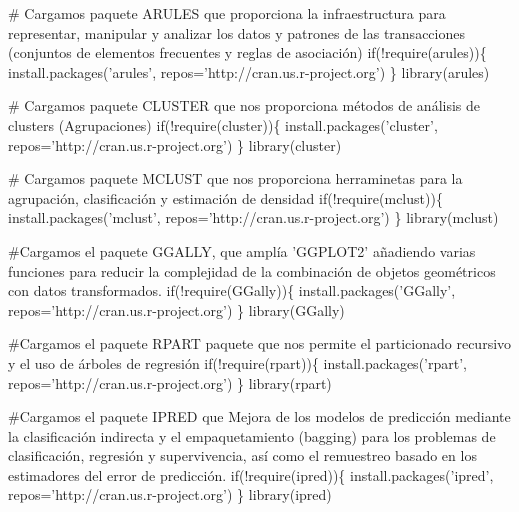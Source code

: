 \documentclass[
]{article}
\newenvironment{Shaded}{\begin{snugshade}}{\end{snugshade}}
\newcommand{\CommentTok}[1]{\textcolor[rgb]{0.50,0.62,0.50}{#1}}
\newcommand{\ControlFlowTok}[1]{\textcolor[rgb]{0.94,0.87,0.69}{#1}}
\newcommand{\DataTypeTok}[1]{\textcolor[rgb]{0.87,0.87,0.75}{#1}}
\newcommand{\KeywordTok}[1]{\textcolor[rgb]{0.94,0.87,0.69}{#1}}
\newcommand{\NormalTok}[1]{\textcolor[rgb]{0.80,0.80,0.80}{#1}}
\newcommand{\OperatorTok}[1]{\textcolor[rgb]{0.94,0.94,0.82}{#1}}
\newcommand{\StringTok}[1]{\textcolor[rgb]{0.80,0.58,0.58}{#1}}
\begin{document}
\begin{Shaded}
\begin{Highlighting}[]
\CommentTok{# Cargamos paquete ARULES que proporciona la infraestructura para representar, manipular y analizar los datos y patrones de las transacciones (conjuntos de elementos frecuentes y reglas de asociación)}
\ControlFlowTok{if}\NormalTok{(}\OperatorTok{!}\KeywordTok{require}\NormalTok{(arules))\{}
    \KeywordTok{install.packages}\NormalTok{(}\StringTok{'arules'}\NormalTok{, }\DataTypeTok{repos=}\StringTok{'http://cran.us.r-project.org'}\NormalTok{)}
\NormalTok{\}}
\KeywordTok{library}\NormalTok{(arules)}

\CommentTok{# Cargamos paquete CLUSTER que nos proporciona métodos de análisis de clusters (Agrupaciones)}
\ControlFlowTok{if}\NormalTok{(}\OperatorTok{!}\KeywordTok{require}\NormalTok{(cluster))\{}
    \KeywordTok{install.packages}\NormalTok{(}\StringTok{'cluster'}\NormalTok{, }\DataTypeTok{repos=}\StringTok{'http://cran.us.r-project.org'}\NormalTok{)}
\NormalTok{\}}
\KeywordTok{library}\NormalTok{(cluster)}

\CommentTok{# Cargamos paquete MCLUST que nos proporciona herraminetas para la agrupación, clasificación y estimación de densidad}
\ControlFlowTok{if}\NormalTok{(}\OperatorTok{!}\KeywordTok{require}\NormalTok{(mclust))\{}
    \KeywordTok{install.packages}\NormalTok{(}\StringTok{'mclust'}\NormalTok{, }\DataTypeTok{repos=}\StringTok{'http://cran.us.r-project.org'}\NormalTok{)}
\NormalTok{\}}
\KeywordTok{library}\NormalTok{(mclust)}

\CommentTok{#Cargamos el paquete GGALLY, que amplía 'GGPLOT2' añadiendo varias funciones para reducir la complejidad de la combinación de objetos geométricos con datos transformados.}
\ControlFlowTok{if}\NormalTok{(}\OperatorTok{!}\KeywordTok{require}\NormalTok{(GGally))\{}
    \KeywordTok{install.packages}\NormalTok{(}\StringTok{'GGally'}\NormalTok{, }\DataTypeTok{repos=}\StringTok{'http://cran.us.r-project.org'}\NormalTok{)}
\NormalTok{\}}
\KeywordTok{library}\NormalTok{(GGally)}

\CommentTok{#Cargamos el paquete RPART paquete que nos permite el particionado recursivo y el uso de árboles de regresión}
\ControlFlowTok{if}\NormalTok{(}\OperatorTok{!}\KeywordTok{require}\NormalTok{(rpart))\{}
    \KeywordTok{install.packages}\NormalTok{(}\StringTok{'rpart'}\NormalTok{, }\DataTypeTok{repos=}\StringTok{'http://cran.us.r-project.org'}\NormalTok{)}
\NormalTok{\}}
\KeywordTok{library}\NormalTok{(rpart)}

\CommentTok{#Cargamos el paquete IPRED que Mejora de los modelos de predicción mediante la clasificación indirecta y el empaquetamiento (bagging) para los problemas de clasificación, regresión y supervivencia, así como el remuestreo basado en los estimadores del error de predicción.}
\ControlFlowTok{if}\NormalTok{(}\OperatorTok{!}\KeywordTok{require}\NormalTok{(ipred))\{}
    \KeywordTok{install.packages}\NormalTok{(}\StringTok{'ipred'}\NormalTok{, }\DataTypeTok{repos=}\StringTok{'http://cran.us.r-project.org'}\NormalTok{)}
\NormalTok{\}}
\KeywordTok{library}\NormalTok{(ipred)}


\end{Highlighting}
\end{Shaded}
\end{document}
